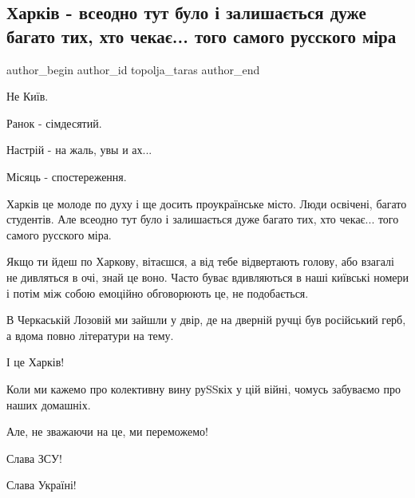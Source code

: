  
 
 
 
 
 
\subsection{Харків - всеодно тут було і залишається дуже багато тих, хто чекає... того самого русского міра}
\label{sec:04_05_2022.fb.topolja_taras.1.harkov_rusmir}
 
\ifcmt
 author_begin
   author_id topolja_taras
 author_end
\fi

Не Київ. 

Ранок - сімдесятий.

Настрій - на жаль, увы и ах...

Місяць - спостереження.

Харків це молоде по духу і ще досить проукраїнське місто. Люди освічені, багато
студентів. Але всеодно тут було і залишається дуже багато тих, хто чекає... того
самого русского міра.

Якщо ти йдеш по Харкову, вітаєшся, а від тебе відвертають голову, або взагалі
не дивляться в очі, знай це воно. Часто буває вдивляються в наші київські
номери і потім між собою емоційно обговорюють це, не подобається. 

В Черкаській Лозовій ми зайшли у двір, де на дверній ручці був російський герб,
а вдома повно літератури на тему. 

І це Харків!

Коли ми кажемо про колективну вину руSSкіх у цій війні, чомусь забуваємо про
наших домашніх. 

Але, не зважаючи на це, ми переможемо!

Слава ЗСУ!

Слава Україні!

